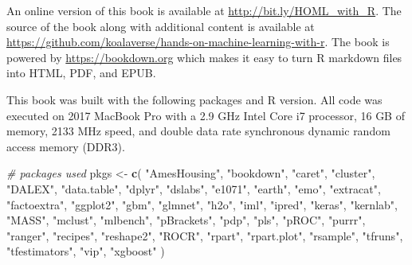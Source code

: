 \documentclass[]{krantz}
\makeatletter
\newenvironment{Shaded}{\begin{snugshade}}{\end{snugshade}}
\newcommand{\CommentTok}[1]{\textcolor[rgb]{0.37,0.37,0.37}{\textit{#1}}}
\newcommand{\KeywordTok}[1]{\textcolor[rgb]{0.27,0.27,0.27}{\textbf{#1}}}
\newcommand{\NormalTok}[1]{#1}
\newcommand{\StringTok}[1]{\textcolor[rgb]{0.5,0.5,0.5}{#1}}
\newenvironment{kframe}{%
\medskip{}
\setlength{\fboxsep}{.8em}
 \def\at@end@of@kframe{}%
 \ifinner\ifhmode%
  \def\at@end@of@kframe{\end{minipage}}%
  \begin{minipage}{\columnwidth}%
 \fi\fi%
 \def\FrameCommand##1{\hskip\@totalleftmargin \hskip-\fboxsep
 \colorbox{shadecolor}{##1}\hskip-\fboxsep
     \hskip-\linewidth \hskip-\@totalleftmargin \hskip\columnwidth}%
 \MakeFramed {\advance\hsize-\width
   \@totalleftmargin\z@ \linewidth\hsize
   \@setminipage}}%
 {\par\unskip\endMakeFramed%
 \at@end@of@kframe}
\renewenvironment{Shaded}{\begin{kframe}}{\end{kframe}}
\makeatother
\begin{document}
An online version of this book is available at \url{http://bit.ly/HOML_with_R}. The source of the book along with additional content is available at \url{https://github.com/koalaverse/hands-on-machine-learning-with-r}. The book is powered by \url{https://bookdown.org} which makes it easy to turn R markdown files into HTML, PDF, and EPUB.

This book was built with the following packages and R version. All code was executed on 2017 MacBook Pro with a 2.9 GHz Intel Core i7 processor, 16 GB of memory, 2133 MHz speed, and double data rate synchronous dynamic random access memory (DDR3).

\begin{Shaded}
\begin{Highlighting}[]
\CommentTok{# packages used}
\NormalTok{pkgs <-}\StringTok{ }\KeywordTok{c}\NormalTok{(}
  \StringTok{"AmesHousing"}\NormalTok{,}
  \StringTok{"bookdown"}\NormalTok{,}
  \StringTok{"caret"}\NormalTok{,}
  \StringTok{"cluster"}\NormalTok{,}
  \StringTok{"DALEX"}\NormalTok{,}
  \StringTok{"data.table"}\NormalTok{,}
  \StringTok{"dplyr"}\NormalTok{,}
  \StringTok{"dslabs"}\NormalTok{,}
  \StringTok{"e1071"}\NormalTok{,}
  \StringTok{"earth"}\NormalTok{,}
  \StringTok{"emo"}\NormalTok{,}
  \StringTok{"extracat"}\NormalTok{,}
  \StringTok{"factoextra"}\NormalTok{,}
  \StringTok{"ggplot2"}\NormalTok{,}
  \StringTok{"gbm"}\NormalTok{,}
  \StringTok{"glmnet"}\NormalTok{,}
  \StringTok{"h2o"}\NormalTok{,}
  \StringTok{"iml"}\NormalTok{,}
  \StringTok{"ipred"}\NormalTok{,}
  \StringTok{"keras"}\NormalTok{,}
  \StringTok{"kernlab"}\NormalTok{,}
  \StringTok{"MASS"}\NormalTok{,}
  \StringTok{"mclust"}\NormalTok{,}
  \StringTok{"mlbench"}\NormalTok{,}
  \StringTok{"pBrackets"}\NormalTok{,}
  \StringTok{"pdp"}\NormalTok{,}
  \StringTok{"pls"}\NormalTok{,}
  \StringTok{"pROC"}\NormalTok{,}
  \StringTok{"purrr"}\NormalTok{,}
  \StringTok{"ranger"}\NormalTok{,}
  \StringTok{"recipes"}\NormalTok{,}
  \StringTok{"reshape2"}\NormalTok{,}
  \StringTok{"ROCR"}\NormalTok{,}
  \StringTok{"rpart"}\NormalTok{,}
  \StringTok{"rpart.plot"}\NormalTok{,}
  \StringTok{"rsample"}\NormalTok{,}
  \StringTok{"tfruns"}\NormalTok{,}
  \StringTok{"tfestimators"}\NormalTok{,}
  \StringTok{"vip"}\NormalTok{,}
  \StringTok{"xgboost"}
\NormalTok{)}


\end{Highlighting}
\end{Shaded}
\end{document}
